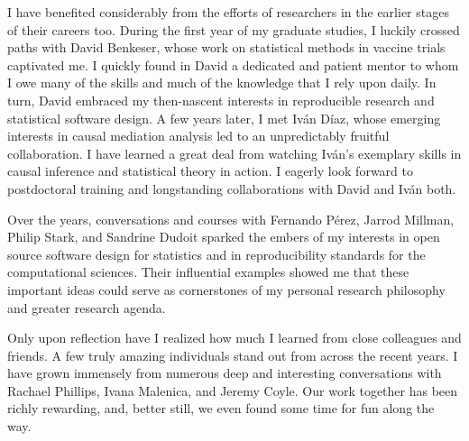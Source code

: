 \documentclass{ucbthesis}
\begin{document}
\begin{frontmatter}
\begin{acknowledgements}
I have benefited considerably from the efforts of researchers in the earlier
stages of their careers too. During the first year of my graduate studies,
I luckily crossed paths with David Benkeser, whose work on statistical methods
in vaccine trials captivated me. I quickly found in David a dedicated and
patient mentor to whom I owe many of the skills and much of the knowledge that
I rely upon daily. In turn, David embraced my then-nascent interests in
reproducible research and statistical software design.
A few years later, I met Iv\'{a}n D\'{i}az, whose emerging interests in causal
mediation analysis led to an unpredictably fruitful collaboration. I have
learned a great deal from watching Iv\'{a}n's exemplary skills in causal
inference and statistical theory in action.
I eagerly look forward to postdoctoral training and longstanding collaborations
with David and Iv\'{a}n both.

Over the years, conversations and courses with Fernando P{\'e}rez, Jarrod
Millman, Philip Stark, and Sandrine Dudoit sparked the embers of my interests in
open source software design for statistics and in reproducibility standards for
the computational sciences. Their influential examples showed me that these
important ideas could serve as cornerstones of my personal research philosophy
and greater research agenda.

Only upon reflection have I realized how much I learned from close colleagues
and friends. A few truly amazing individuals stand out from across the recent
years. I have grown immensely from numerous deep and interesting conversations
with Rachael Phillips, Ivana Malenica, and Jeremy Coyle. Our work together has
been richly rewarding, and, better still, we even found some time for fun along
the way.

\end{acknowledgements}

\end{frontmatter}

\pagestyle{headings}








\printbibliography
\end{document}

